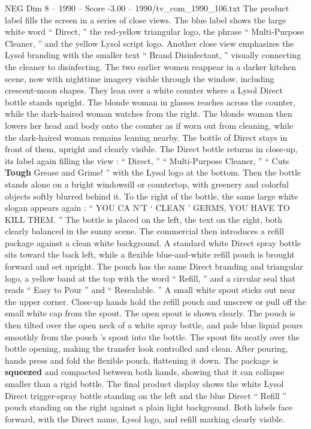 \begin{textsample}{NEG Dim 8 – 1990 – Score -3.00 – 1990/tv\_com\_1990\_106.txt}
The product label fills the screen in a series of close views.
The blue label shows the large white word “ Direct, ” the red-yellow triangular logo, the phrase “ Multi-Purpose Cleaner, ” and the yellow Lysol script logo.
Another close view emphasizes the Lysol branding with the smaller text “ Brand Disinfectant, ” visually connecting the cleaner to disinfecting.
The two earlier women reappear in a darker kitchen scene, now with nighttime imagery visible through the window, including crescent-moon shapes.
They lean over a white counter where a Lysol Direct bottle stands upright.
The blonde woman in glasses reaches across the counter, while the dark-haired woman watches from the right.
The blonde woman then lowers her head and body onto the counter as if worn out from cleaning, while the dark-haired woman remains leaning nearby.
The bottle of Direct stays in front of them, upright and clearly visible.
The Direct bottle returns in close-up, its label again filling the view : “ Direct, ” “ Multi-Purpose Cleaner, ” “ Cuts \textbf{Tough} Grease and Grime! ” with the Lysol logo at the bottom.
Then the bottle stands alone on a bright windowsill or countertop, with greenery and colorful objects softly blurred behind it.
To the right of the bottle, the same large white slogan appears again : “ YOU CA N’T ‘ CLEAN ’ GERMS, YOU HAVE TO KILL THEM. ” The bottle is placed on the left, the text on the right, both clearly balanced in the sunny scene.
The commercial then introduces a refill package against a clean white background.
A standard white Direct spray bottle sits toward the back left, while a flexible blue-and-white refill pouch is brought forward and set upright.
The pouch has the same Direct branding and triangular logo, a yellow band at the top with the word “ Refill, ” and a circular seal that reads “ Easy to Pour ” and “ Resealable. ” A small white spout sticks out near the upper corner.
Close-up hands hold the refill pouch and unscrew or pull off the small white cap from the spout.
The open spout is shown clearly.
The pouch is then tilted over the open neck of a white spray bottle, and pale blue liquid pours smoothly from the pouch ’s spout into the bottle.
The spout fits neatly over the bottle opening, making the transfer look controlled and clean.
After pouring, hands press and fold the flexible pouch, flattening it down.
The package is \textbf{squeezed} and compacted between both hands, showing that it can collapse smaller than a rigid bottle.
The final product display shows the white Lysol Direct trigger-spray bottle standing on the left and the blue Direct “ Refill ” pouch standing on the right against a plain light background.
Both labels face forward, with the Direct name, Lysol logo, and refill marking clearly visible.

\end{textsample}
